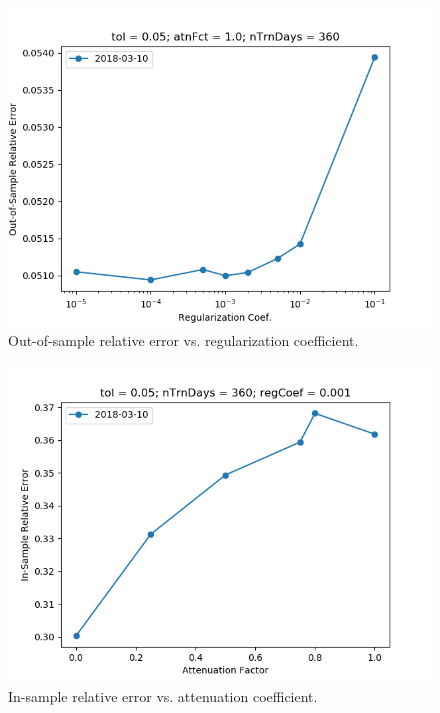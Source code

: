 \documentclass{article}
\begin{document}
\begin{figure}\label{fig:regCoef-sensitivity-oos-error}
\includegraphics[bb=0 0 640 480]{figures/regCoef-sensitivity-oos-error.png}
\caption{Out-of-sample relative error vs. regularization coefficient.}
\end{figure}

\begin{figure}\label{fig:atnFct-sensitivity-error}
\includegraphics[bb=0 0 640 480]{figures/atnFct-sensitivity-error.png}
\caption{In-sample relative error vs. attenuation coefficient.}
\end{figure}
\end{document}
